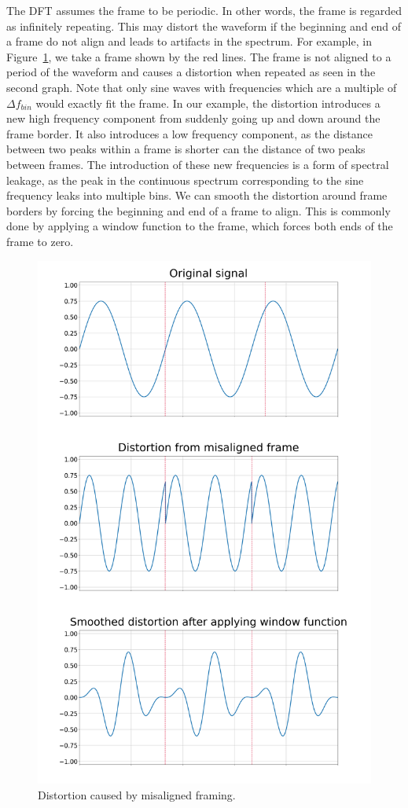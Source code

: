 \documentclass[10pt,twocolumn]{article}
\begin{document}
The DFT assumes the frame to be periodic. In other words, the frame is regarded as infinitely repeating. This may distort the waveform if the beginning and end of a frame do not align and leads to artifacts in the spectrum. For example, in Figure~\ref{fig:framedistortion}, we take a frame shown by the red lines. The frame is not aligned to a period of the waveform and causes a distortion when repeated as seen in the second graph. Note that only sine waves with frequencies which are a multiple of $\Delta f_{bin}$ would exactly fit the frame. In our example, the distortion introduces a new high frequency component from suddenly going up and down around the frame border. It also introduces a low frequency component, as the distance between two peaks within a frame is shorter can the distance of two peaks between frames. The introduction of these new frequencies is a form of spectral leakage, as the peak in the continuous spectrum corresponding to the sine frequency leaks into multiple bins. We can smooth the distortion around frame borders by forcing the beginning and end of a frame to align. This is commonly done by applying a window function to the frame, which forces both ends of the frame to zero.
\begin{figure}[h]
    \centering
    \includegraphics[width=\linewidth]{fig/framedistortion.png}
    \caption{Distortion caused by misaligned framing.}
    \label{fig:framedistortion}
\end{figure}
\end{document}
